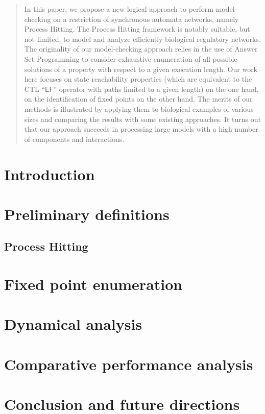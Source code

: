 \documentclass{tlp}
\begin{document}
\label{firstpage}
%
\begin{abstract}
In this paper, we propose a new logical approach to perform model-checking on a restriction of synchronous automata networks, namely Process Hitting. The Process Hitting framework is notably suitable, but not limited, to model and analyze efficiently biological regulatory networks. 
The originality of our model-checking approach relies in the use of Answer Set Programming to consider exhaustive enumeration of all possible solutions of a property with respect to a given execution length.  Our work here focuses on state reachability properties (which are equivalent to the CTL ``$\mathsf{EF}$'' operator with paths limited to a given length) on the one hand, on the identification of fixed points on the other hand.
The merits of our methods is illustrated by applying them to
biological examples of various sizes
and comparing the results with some existing approaches.
It turns out that our approach succeeds in processing large models
with a high number of components and interactions.

\end{abstract}

\section{Introduction}


\section{Preliminary definitions}
\label{sec:defs}
%
\subsection{Process Hitting}


\section{Fixed point enumeration}
\label{sec:fixpoint}


\section{Dynamical analysis}
\label{sec:dynamics}


\section{Comparative performance analysis}
\label{sec:comparison}



\section{Conclusion and future directions}
\label{sec:ccl}







\clearpage
\appendix


\end{document}
